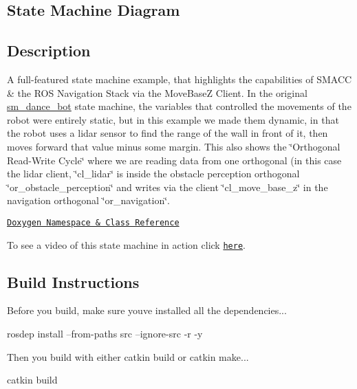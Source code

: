 \subsection*{State Machine Diagram}



\subsection*{Description}

A full-\/featured state machine example, that highlights the capabilities of S\+M\+A\+CC \& the R\+OS Navigation Stack via the Move\+BaseZ Client. In the original \hyperlink{namespacesm__dance__bot}{sm\+\_\+dance\+\_\+bot} state machine, the variables that controlled the movements of the robot were entirely static, but in this example we made them dynamic, in that the robot uses a lidar sensor to find the range of the wall in front of it, then moves forward that value minus some margin. This also shows the \char`\"{}\+Orthogonal Read-\/\+Write Cycle\char`\"{} where we are reading data from one orthogonal (in this case the lidar client, \char`\"{}cl\+\_\+lidar\char`\"{} is inside the obstacle perception orthogonal \char`\"{}or\+\_\+obstacle\+\_\+perception\char`\"{} and writes via the client \char`\"{}cl\+\_\+move\+\_\+base\+\_\+z\char`\"{} in the navigation orthogonal \char`\"{}or\+\_\+navigation\char`\"{}.~\newline


\href{https://reelrbtx.github.io/SMACC_Documentation/master/html/namespacesm__dance__bot__strikes__back.html}{\tt Doxygen Namespace \& Class Reference}

To see a video of this state machine in action click \href{https://www.youtube.com/watch?v=ucMr5Dg6UpU}{\tt here}.

\subsection*{Build Instructions}

Before you build, make sure you\textquotesingle{}ve installed all the dependencies...


\begin{DoxyCode}
rosdep install --from-paths src --ignore-src -r -y 
\end{DoxyCode}


Then you build with either catkin build or catkin make...


\begin{DoxyCode}
catkin build
\end{DoxyCode}
